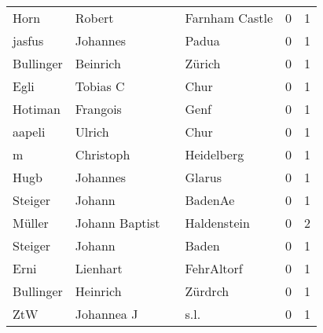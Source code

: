 \begin{center}
\begin{tiny}
\begin{longtabu}{llllrr}
                     Horn &                             Robert &             &                              Farnham Castle &          0 &         1 \\
                   jasfus &                           Johannes &             &                                       Padua &          0 &         1 \\
                Bullinger &                           Beinrich &             &                                      Zürich &          0 &         1 \\
                     Egli &                           Tobias C &             &                                        Chur &          0 &         1 \\
                  Hotiman &                           Frangois &             &                                        Genf &          0 &         1 \\
                   aapeli &                             Ulrich &             &                                        Chur &          0 &         1 \\
                        m &                          Christoph &             &                                  Heidelberg &          0 &         1 \\
                     Hugb &                           Johannes &             &                                      Glarus &          0 &         1 \\
                  Steiger &                             Johann &             &                                     BadenAe &          0 &         1 \\
                   Müller &                     Johann Baptist &             &                                 Haldenstein &          0 &         2 \\
                  Steiger &                             Johann &             &                                       Baden &          0 &         1 \\
                     Erni &                           Lienhart &             &                                  FehrAltorf &          0 &         1 \\
                Bullinger &                           Heinrich &             &                                     Zürdrch &          0 &         1 \\
                      ZtW &                         Johannea J &             &                                        s.l. &          0 &         1 \\

\end{longtabu}
\end{tiny}
\end{center}
